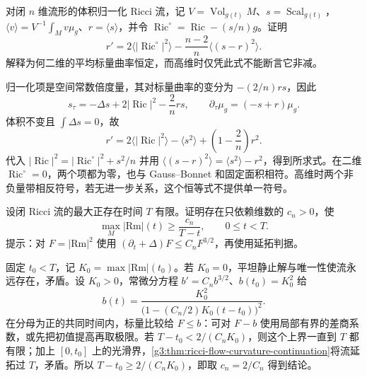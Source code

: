 \begin{exercise}\label{g3:ex:ricci-average-scalar}
对闭 \(n\) 维流形的体积归一化 Ricci 流，记 \(V=\operatorname{Vol}_{g(t)}M\)、\(s=\operatorname{Scal}_{g(t)}\)，\(\langle v\rangle=V^{-1}\int_Mv\mu_g\)、\(r=\langle s\rangle\)，并令 \(\operatorname{Ric}^{\circ}=\operatorname{Ric}-(s/n)g\)。证明
\[
r'=2\langle|\operatorname{Ric}^{\circ}|^2\rangle
-\frac{n-2}{n}\langle(s-r)^2\rangle.
\]
解释为何二维的平均标量曲率恒定，而高维时仅凭此式不能断言它非减。
\end{exercise}
\begin{solution}
归一化项是空间常数倍度量，其对标量曲率的变分为 \(-(2/n)rs\)，因此
\[
s_\tau=-\Delta s+2|\operatorname{Ric}|^2-\frac2nrs,
\qquad \partial_\tau\mu_g=(-s+r)\mu_g.
\]
体积不变且 \(\int\Delta s=0\)，故
\[
r'=2\langle|\operatorname{Ric}|^2\rangle-\langle s^2\rangle
+\left(1-\frac2n\right)r^2.
\]
代入 \(|\operatorname{Ric}|^2=|\operatorname{Ric}^{\circ}|^2+s^2/n\) 并用 \(\langle(s-r)^2\rangle=\langle s^2\rangle-r^2\)，得到所求式。在二维 \(\operatorname{Ric}^{\circ}=0\)，两个项都为零，也与 Gauss--Bonnet 和固定面积相符。高维时两个非负量带相反符号，若无进一步关系，这个恒等式不提供单一符号。
\end{solution}

\begin{exercise}\label{g3:ex:ricci-curvature-rate}
设闭 Ricci 流的最大正存在时间 \(T\) 有限。证明存在只依赖维数的 \(c_n>0\)，使
\[
\max_M|\mathrm{Rm}|(t)\ge\frac{c_n}{T-t},\qquad 0\le t<T.
\]
提示：对 \(F=|\mathrm{Rm}|^2\) 使用 \((\partial_t+\Delta)F\le C_nF^{3/2}\)，再使用延拓判据。
\end{exercise}
\begin{solution}
固定 \(t_0<T\)，记 \(K_0=\max|\mathrm{Rm}|(t_0)\)。若 \(K_0=0\)，平坦静止解与唯一性使流永远存在，矛盾。设 \(K_0>0\)，常微分方程 \(b'=C_nb^{3/2}\)、\(b(t_0)=K_0^2\) 给
\[
b(t)=\frac{K_0^2}{\bigl(1-(C_n/2)K_0(t-t_0)\bigr)^2}.
\]
在分母为正的共同时间内，标量比较给 \(F\le b\)：可对 \(F-b\) 使用局部有界的差商系数，或先把初值提高再取极限。若 \(T-t_0<2/(C_nK_0)\)，则这个上界一直到 \(T\) 都有限；加上 \([0,t_0]\) 上的光滑界，\cref{g3:thm:ricci-flow-curvature-continuation}将流延拓过 \(T\)，矛盾。所以 \(T-t_0\ge2/(C_nK_0)\)，即取 \(c_n=2/C_n\) 得到结论。
\end{solution}

